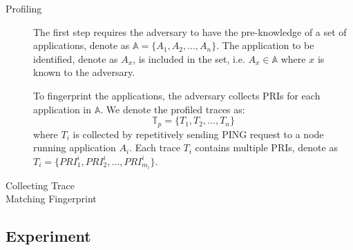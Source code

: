 \begin{description}
	\item[Profiling]
	The first step requires the adversary to have the pre-knowledge of a set of applications, denote as $\mathbb{A} = \{A_1, A_2, ..., A_n\}$. The application to be identified, denote as $A_x$, is included in the set, i.e. $A_x \in \mathbb{A}$ where $x$ is known to the adversary.
	
	To fingerprint the applications, the adversary collects PRIs for each application in $\mathbb{A}$. We denote the profiled traces as:
\begin{equation}
\mathbb{T}_p = \{T_1, T_2, ..., T_n\}
\end{equation}
where $T_i$ is collected by repetitively sending PING request to a node running application $A_i$. Each trace $T_i$ contains multiple PRIs, denote as $T_i = \{PRI^i_1, PRI^i_2, ..., PRI^i_{m_i}\}$.

	\item[Collecting Trace]
	
	
	\item[Matching Fingerprint]

\end{description}

\subsection{Experiment}